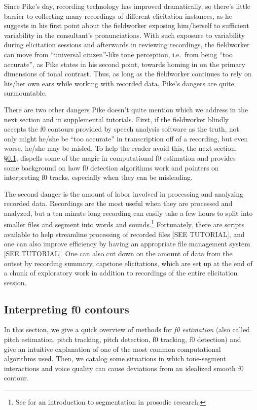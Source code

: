 \documentclass[12pt]{article}
\begin{document}
Since Pike's day, recording technology has improved 
dramatically, so there's little barrier to collecting many recordings
of different elicitation instances, as he suggests in his first point
about the fieldworker exposing him/herself to sufficient variability
in the consultant's pronunciations. With such exposure to variability
during elicitation sessions and afterwards in reviewing recordings,
the fieldworker can move from ``universal citizen''-like tone
perception, i.e.\ from being ``too accurate'', as Pike states in his
second point, towards homing in on the primary dimensions of tonal
contrast. Thus, as long as the fieldworker continues to rely on
his/her own ears while working with recorded data, Pike's dangers are
quite surmountable. 

There are two other dangers Pike doesn't quite mention which we
address in the next section and in supplemental tutorials. First, if
the fieldworker blindly accepts the f0 contours provided by speech
analysis software as the truth, not only might he/she be ``too
accurate'' in transcription off of a recording, but even worse, he/she
may be misled. To help the reader avoid this, the next section, \S\ref{sec:pitch-tracking}, dispells some of the magic in
computational f0 estimation and provides some
background on how f0 detection algorithms work and pointers on
interpreting f0 tracks, especially when they can be misleading. 

The second danger is the amount of labor involved in processing and
analyzing recorded data. Recordings are the most useful when they are
processed and analyzed, but a ten minute long recording
can easily take a few hours to split into smaller files and segment into words and
sounds.\footnote{See \citet{Turk:2006} for an introduction to segmentation in prosodic
research.} Fortunately, there are scripts available to help streamline
processing of recorded files [SEE TUTORIAL], and one can also improve efficiency by
having an appropriate file management system [SEE TUTORIAL]. One can also cut down on
the amount of data from the outset by recording summary, capstone
elicitations, which are set up at the end of a chunk of exploratory
work in addition to recordings of the entire elicitation session. 


\subsection{Interpreting f0 contours}
\label{sec:pitch-tracking}

In this section, we give a quick overview of methods for \textit{f0
  estimation} (also called pitch estimation, pitch tracking, pitch
detection, f0 tracking, f0 detection) and give an intuitive
explanation of one of the most common computational algorithms
used. Then, we catalog some situations in which tone-segment
interactions and voice quality can cause deviations from an idealized
smooth f0 contour. 
\end{document}
